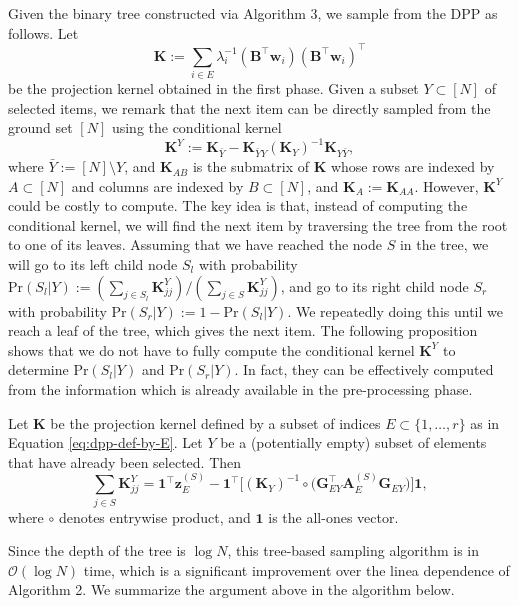 {
Given the binary tree constructed via Algorithm 3, we sample from the DPP as follows. Let 
\begin{equation}\label{eq:dpp-def-by-E}
    \mathbf{K}:= \sum_{i\in E} \lambda_i^{-1} (\mathbf{B}^\top \mathbf{w}_i)(\mathbf{B}^\top \mathbf{w}_i)^\top
\end{equation}
be the projection kernel obtained in the first phase. Given a subset $Y\subset [N]$ of selected items, 
we remark that the next item can be directly sampled from the ground set $[N]$ using the conditional kernel
\[\mathbf{K}^Y := \mathbf{K}_{\bar Y} - \mathbf{K}_{\bar Y Y} (\mathbf{K}_Y)^{-1} \mathbf{K}_{Y\bar Y}, \]
where $\bar Y:= [N]\setminus Y$, and $\mathbf{K}_{AB}$ is the submatrix of $\mathbf{K}$ whose rows are indexed by $A\subset [N]$ and columns are indexed by $B\subset [N]$, and $\mathbf{K}_A := \mathbf{K}_{AA}$. However, $\mathbf{K}^Y$ could be costly to compute. The key idea is that, instead of computing the conditional kernel, we will find the next item by traversing the tree from the root to one of its leaves. 
Assuming that we have reached the node $S$ in the tree, we will go to its left child node $S_l$ with probability 
$\mathrm{Pr}(S_l | Y):= (\sum_{j \in S_l} \mathbf{K}^Y_{jj})/(\sum_{j \in S} \mathbf{K}^Y_{jj})$,
and go to its right child node $S_r$ with probability $\mathrm{Pr}(S_r|Y) := 1 - \mathrm{Pr}(S_l|Y)$.
We repeatedly doing this until we reach a leaf of the tree, which gives the next item. 
The following proposition shows that we do not have to fully compute the conditional kernel $\mathbf{K}^Y$ to determine $\mathrm{Pr}(S_l|Y)$ and $\mathrm{Pr}(S_r|Y)$. In fact, they can be effectively computed from the information which is already available in the pre-processing phase.
\begin{proposition} \label{prop:tree-based}
    Let $\mathbf{K}$ be the projection kernel defined by a subset of indices $E\subset \{1,\ldots,r\}$ as in Equation \eqref{eq:dpp-def-by-E}.
    Let $Y$ be a (potentially empty) subset of elements that have already been selected. Then
    \[ \sum_{j\in S} \mathbf{K}^Y_{jj} = \mathbf{1}^\top \mathbf{z}^{(S)}_E - \mathbf{1}^\top \Big [(\mathbf{K}_Y)^{-1} \circ \Big (\mathbf{G}_{EY}^\top \mathbf{A}^{(S)}_E \mathbf{G}_{EY}\Big) \Big ] \mathbf{1},\]
    where $\circ$ denotes entrywise product, and $\mathbf{1}$ is the all-ones vector.
\end{proposition}
  Since the depth of the tree is $\log N$, this tree-based sampling algorithm is in $\mathcal{O}(\log N)$ time, which is a significant improvement over the linea dependence of Algorithm 2. We summarize the argument above in the algorithm below.
}


